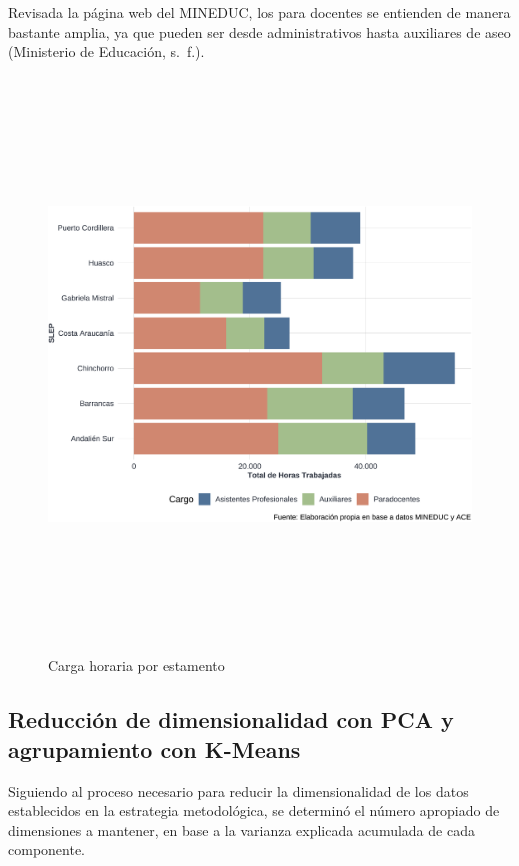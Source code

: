 \documentclass[
  12pt,
  letterpaper,
]{article}
\begin{document}
Revisada la página web del MINEDUC, los para docentes se entienden de manera bastante amplia, ya que pueden ser desde administrativos hasta auxiliares de aseo (Ministerio de Educación, s.~f.).

\begin{figure}

{\centering \includegraphics[width=0.8\linewidth,height=6in]{tesis_ver_final_files/figure-latex/grafico-asistentes-jorn-1} 

}

\caption{Carga horaria por estamento}\label{fig:grafico-asistentes-jorn}
\end{figure}

\subsection{Reducción de dimensionalidad con PCA y agrupamiento con K-Means}\label{reducciuxf3n-de-dimensionalidad-con-pca-y-agrupamiento-con-k-means}

Siguiendo al proceso necesario para reducir la dimensionalidad de los datos establecidos en la estrategia metodológica, se determinó el número apropiado de dimensiones a mantener, en base a la varianza explicada acumulada de cada componente.
\end{document}
